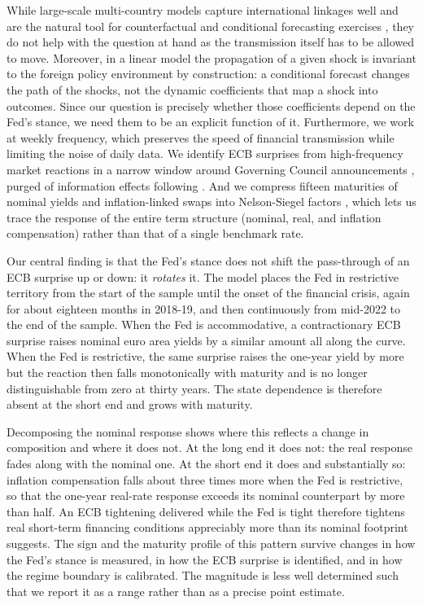 While large-scale multi-country models capture international linkages well and are the natural tool for counterfactual and conditional forecasting exercises \citep[among many others,][]{dees2007exploring, feldkircher2016international, georgiadis2017bi, koop2016model, burriel2018uncovering, dees2021global}, they do not help with the question at hand as the transmission itself has to be allowed to move. Moreover, in a linear model the propagation of a given shock is invariant to the foreign policy environment by construction: a conditional forecast changes the path of the shocks, not the dynamic coefficients that map a shock into outcomes. Since our question is precisely whether those coefficients depend on the Fed's stance, we need them to be an explicit function of it. Furthermore, we work at weekly frequency, which preserves the speed of financial transmission while limiting the noise of daily data. We identify ECB surprises from high-frequency market reactions in a narrow window around Governing Council announcements \citep{altavilla2019measuring}, purged of information effects following \citet{jarocinski2020deconstructing}. And we compress fifteen maturities of nominal yields and inflation-linked swaps into Nelson-Siegel factors \citep{DIEBOLD2006337}, which lets us trace the response of the entire term structure (nominal, real, and inflation compensation) rather than that of a single benchmark rate.

Our central finding is that the Fed's stance does not shift the pass-through of an ECB surprise up or down: it \textit{rotates} it. The model places the Fed in restrictive territory from the start of the sample until the onset of the financial crisis, again for about eighteen months in 2018-19, and then continuously from mid-2022 to the end of the sample. When the Fed is accommodative, a contractionary ECB surprise raises nominal euro area yields by a similar amount all along the curve.%
When the Fed is restrictive, the same surprise raises the one-year yield by more but the reaction then falls monotonically with maturity and is no longer distinguishable from zero at thirty years. The state dependence is therefore absent at the short end and grows with maturity.

Decomposing the nominal response shows where this reflects a change in composition and where it does not. At the long end it does not: the real response fades along with the nominal one. At the short end it does and substantially so: inflation compensation falls about three times more when the Fed is restrictive, so that the one-year real-rate response exceeds its nominal counterpart by more than half. An ECB tightening delivered while the Fed is tight therefore tightens real short-term financing conditions appreciably more than its nominal footprint suggests. The sign and the maturity profile of this pattern survive changes in how the Fed's stance is measured, in how the ECB surprise is identified, and in how the regime boundary is calibrated. The magnitude is less well determined such that we report it as a range rather than as a precise point estimate.

